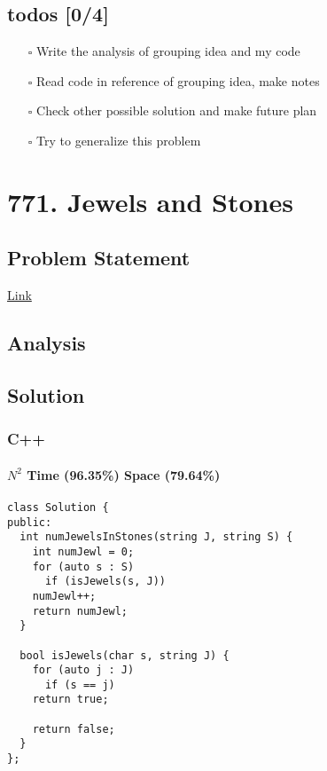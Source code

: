 \documentclass[12pt]{book}
\begin{document}
\section{todos [0/4]}
\label{sec:orge869441}
\begin{itemize}
\item[{$\square$}] Write the analysis of grouping idea and my code
\item[{$\square$}] Read code in reference of grouping idea, make notes
\item[{$\square$}] Check other possible solution and make future plan
\item[{$\square$}] Try to generalize this problem
\end{itemize}
\chapter{771. Jewels and Stones}
\label{sec:org8f369e8}
\section{Problem Statement}
\label{sec:org2e522a7}
\href{https://leetcode.com/problems/jewels-and-stones/}{Link}
\section{Analysis}
\label{sec:org9d8f975}
\section{Solution}
\label{sec:orgacdf539}
\subsection{C++}
\label{sec:org0b30f60}
\subsubsection{\(N^2\) Time (96.35\%) Space (79.64\%)}
\label{sec:org5ecee0f}
\begin{verbatim}
class Solution {
public:
  int numJewelsInStones(string J, string S) {
    int numJewl = 0;
    for (auto s : S)
      if (isJewels(s, J))
	numJewl++;
    return numJewl;
  }

  bool isJewels(char s, string J) {
    for (auto j : J)
      if (s == j)
	return true;

    return false;
  }
};
\end{verbatim}
\end{document}
